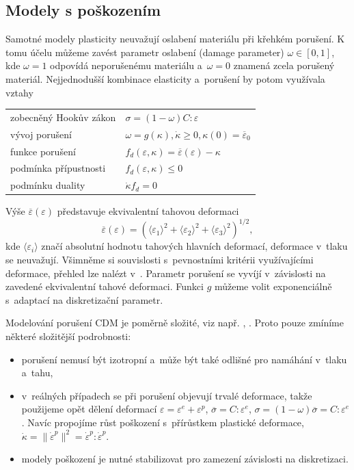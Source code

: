 \documentclass{article}
\begin{document}
\subsection{Modely s poškozením}
Samotné modely plasticity neuvažují oslabení materiálu při křehkém porušení. K tomu účelu můžeme zavést parametr oslabení (damage parameter) $\omega\in[0,1]$, kde $\omega = 1$ odpovídá neporušenému materiálu a~$\omega = 0$ znamená zcela porušený materiál. Nejjednodušší kombinace elasticity a~porušení by potom využívala vztahy
\begin{table}[h!]
	\centering
	\begin{tabular}{ll}
		\hline
		zobecněný Hookův zákon & $\sigma = (1-\omega)C : \varepsilon$\\
		vývoj porušení & $\omega = g(\kappa), \dot{\kappa} \geq 0, \kappa(0) = \overline{\varepsilon}_0$\\
		funkce porušení & $f_d(\varepsilon,\kappa)=\overline{\varepsilon}(\varepsilon)-\kappa$\\
		podmínka přípustnosti & $f_d(\varepsilon,\kappa)\leq 0$ \\
		podmínku duality & $\dot{\kappa} f_d =0$\\
		\hline
	\end{tabular}
\end{table}

Výše $\overline{\varepsilon}(\varepsilon)$ představuje ekvivalentní tahovou deformaci
$$
	\overline{\varepsilon}(\varepsilon) = (\langle\varepsilon_1\rangle^2+\langle\varepsilon_2\rangle^2+\langle\varepsilon_3\rangle^2)^{1/2},
$$
kde $\langle\varepsilon_i\rangle$ značí absolutní hodnotu tahových hlavních deformací, deformace
v~tlaku se neuvažují. Všimněme si souvislosti s~pevnostními kritérii využívajícími deformace, přehled lze nalézt v~\cite{kwasniewski_strain_based_2010}.
Parametr porušení se vyvíjí v~závislosti na zavedené ekvivalentní tahové deformaci. Funkci $g$ můžeme volit exponenciálně s~adaptací na diskretizační parametr.

Modelování porušení CDM je poměrně složité, viz např. \cite{Lemaitre1992}, \cite{Neto2011}. Proto pouze zmíníme některé složitější podrobnosti:
\begin{itemize}
	\item porušení nemusí být izotropní a~může být také odlišné pro namáhání v~tlaku a~tahu,
	\item v~reálných případech se při porušení objevují trvalé deformace, takže
	použijeme opět dělení deformací $\varepsilon=\varepsilon^e + \varepsilon^p$, $\overline{\sigma} = C : \varepsilon^e$, $\sigma = (1-\omega)\overline{\sigma} = C : \varepsilon^e$. Navíc propojíme růst poškození s~přírůstkem plastické deformace, $\dot{\kappa} = \|\dot{\varepsilon}^p\|^2 = \dot{\varepsilon}^p : \dot{\varepsilon}^p$.
	\item modely poškození je nutné stabilizovat pro zamezení závislosti na diskretizaci.
\end{itemize}
\end{document}
